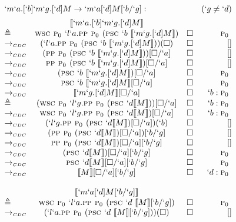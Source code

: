 \begin{Proof}
\[\begin{array}{lcrr}
\end{array}
\]
\[
\begin{array}{lcrr}
  \prooflabel{`m`a.[`b]`m`g.[`d]M \to `m`a[`d]M[`b/`g]} & (`g \not= `d) \\
             & \tr{`m`a.[`b]`m`g.[`d]M} \\
  \triangleq & \wsc \gp `l`a.\pp \gp (\psc `b\ \tr{`m`g.[`d]M})     & \square & \gp        \\
  \tocdc\    & (`l`a.\pp \gp (\psc `b\ \tr{`m`g.[`d]M}))(\square)   & \square & []         \\
  \tocdc\    & (\pp \gp (\psc `b\ \tr{`m`g.[`d]M}))[\square/`a]     & \square & []         \\
  \tocdc\    & \pp \gp (\psc `b\ \tr{`m`g.[`d]M})[\square/`a]       & \square & []         \\
  \tocdc\    & (\psc `b\ \tr{`m`g.[`d]M})[\square/`a]               & \square & \gp        \\
  \tocdc\    & \psc `b\ \tr{`m`g.[`d]M}[\square/`a]                 & \square & \gp        \\
  \tocdc\    & \tr{`m`g.[`d]M}[\square/`a]                          & \square & `b:\gp  \\
  \triangleq & (\wsc \gp `l`g.\pp \gp (\psc `d \tr{M}))[\square/`a] & \square & `b:\gp  \\
  \tocdc\    & \wsc \gp `l`g.\pp \gp (\psc `d \tr{M})[\square/`a]   & \square & `b:\gp  \\
  \tocdc\    & (`l`g.\pp \gp (\psc `d \tr{M})[\square/`a])(`b)      & \square & []  \\
  \tocdc\    & (\pp \gp (\psc `d \tr{M})[\square/`a])[`b/`g]        & \square & []  \\
  \tocdc\    & \pp \gp (\psc `d \tr{M})[\square/`a][`b/`g]          & \square & []  \\
  \tocdc\    & (\psc `d \tr{M})[\square/`a][`b/`g]                  & \square & \gp  \\
  \tocdc\    & \psc `d \tr{M}[\square/`a][`b/`g]                    & \square & \gp  \\
  \tocdc\    & \tr{M}[\square/`a][`b/`g]                            & \square & `d:\gp  \\
\\
             & \tr{`m`a[`d]M[`b/`g]} \\
  \triangleq & \wsc \gp `l`a.\pp \gp (\psc `d\ \tr{M}[`b/`g])   & \square & \gp       \\
  \tocdc\     & (`l`a.\pp \gp (\psc `d\ \tr{M}[`b/`g]))(\square) & \square & []        \\

\end{array}\]
\end{Proof}
